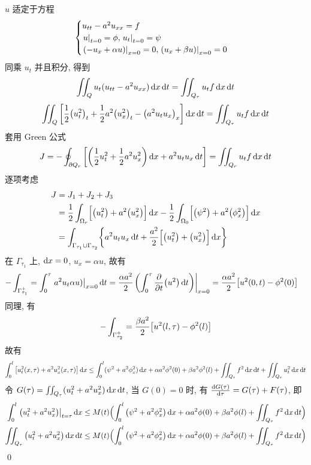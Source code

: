\begin{solution}
$u$ 适定于方程
\[ \begin{cases}
u_{tt} - a^2 u_{xx} = f \\
{\left.{u} \right|}_{t=0} = \phi, {\left.{u_t} \right|}_{t=0} = \psi \\
{\left.{{\left( {-u_x + \alpha u} \right)}} \right|}_{x=0} = 0,
{\left.{{\left( {u_x + \beta u} \right)}} \right|}_{x=0} = 0
\end{cases} \]
同乘 $u_t$ 并且积分, 得到
\[
\iint_Q u_t (u_{tt} - a^2 u_{xx}) \operatorname{d\!} x \operatorname{d\!} t
= \iint_{Q_\tau} u_t f \operatorname{d\!} x \operatorname{d\!} t
\]
\[
\iint_Q {\left[ {\frac12 \bigl( u_t^2 \bigr)_t
    + \frac12 a^2 \bigl( u_x^2 \bigr)_t
    - \bigl( a^2 u_t u_x \bigr)_x } \right]} \operatorname{d\!} x \operatorname{d\!} t
= \iint_{Q_\tau} u_t f \operatorname{d\!} x \operatorname{d\!} t
\]
套用 Green 公式
\[
J = -\oint_{\partial Q_r} {\left[ {
    {\left( {\frac12 u_t^2 + \frac12 a^2 u_x^2} \right)} \operatorname{d\!} x
    + a^2 u_t u_x \operatorname{d\!} t
} \right]} = \iint_{Q_r} u_t f \operatorname{d\!} x \operatorname{d\!} t
\]
逐项考虑
\begin{align*}
J &= J_1 + J_2 + J_3 \\
&= \frac12 \int_{\Omega_r} \Bigl[
    \bigl( u_t^2 \bigr) + a^2 \bigl( u_x^2 \bigr)
    \Bigr] \operatorname{d\!} x - \frac12 \int_{\Omega_0} \Bigl[
    \bigl( \psi^2 \bigr) + a^2 \bigl( \phi_x^2 \bigr)
    \Bigr] \operatorname{d\!} x \\
&= \int_{\Gamma_{\tau_1} \cup \Gamma_{\tau_2}} \biggl\{
    a^2 u_t u_x \operatorname{d\!} t + \frac{a^2}{2} \Bigl[
    \bigl( u_t^2 \bigr) + \bigl( u_x^2 \bigr)
    \Bigr] \operatorname{d\!} x \biggr\}
\end{align*}
在 $\Gamma_{\tau_1}$ 上, $\operatorname{d\!} x = 0$, $u_x = \alpha u$, 故有
\begin{align*}
-\int_{\Gamma_{\tau_1}^+} &=
    \int_0^{\tau} {\left.{a^2u_t\alpha u)} \right|}_{x=0} \operatorname{d\!} t
= \frac{\alpha a^2}{2} {\left.{
    {\left( {\int_0^\tau {{\frac{\partial {}}{\partial {t}}}} {\left( {u^2} \right)} \operatorname{d\!} t} \right)}
    } \right|}_{x=0}
= \frac{\alpha a^2}{2} {\left[ {u^2(0, t) - \phi^2(0)} \right]}
\end{align*}
同理, 有
\[
-\int_{\Gamma_{\tau_2}^+} =
\frac{\beta a^2}{2} {\left[ {u^2(l, \tau) - \phi^2(l)} \right]}
\]
故有
\[
\int_0^l {\left[ {u_t^2(x, \tau) + a^2 u_x^2(x, \tau)} \right]} \operatorname{d\!} x
\leq \int_0^l (\psi^2 + a^2 \phi_x^2) \operatorname{d\!} x + \alpha a^2 \phi^2(0)
    + \beta a^2 \phi^2(l) \\+ \iint_{Q_\tau} f^2 \operatorname{d\!} x \operatorname{d\!} t
 + \iint_{Q_\tau} u_t^2 \operatorname{d\!} x \operatorname{d\!} t
\]
令 $G(\tau) = \iint_{Q_\tau} (u_t^2 + a^2 u_x^2) \operatorname{d\!} x \operatorname{d\!} t$, 当 $G(0)=0$
时, 有 ${\frac{\operatorname{d\!} {G(\tau)}}{\operatorname{d\!} {\tau}}} = G(\tau) + F(\tau)$, 即
\begin{align*}
\int_0^l \mfwhen{\mclosure{u_t^2 + a^2 u_x^2}}{t=\tau} \diff x
&\leq M(t) \Bigl(
    \int_0^l \mclosure{\psi^2 + a^2 \phi_x^2} \diff x
    + \alpha a^2 \phi(0) + \beta a^2 \phi(l)
        + \iint_{Q_\tau} f^2 \diff x \diff t \Bigr) \\
\iint_{Q_\tau} \mclosure{u_t^2 + a^2 u_x^2} \diff x \diff t
&\leq M(t) \Bigl(
    \int_0^l \mclosure{\psi^2 + a^2 \phi_x^2} \diff x
    + \alpha a^2 \phi(0) + \beta a^2 \phi(l)
        + \iint_{Q_\tau} f^2 \diff x \diff t \Bigr)
\end{align*}
\qed
\end{solution}
\endinput
